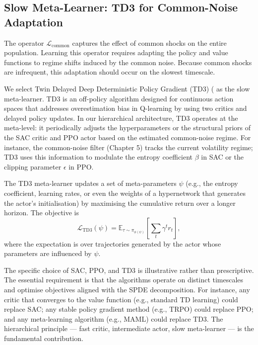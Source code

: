 \subsection{Slow Meta-Learner: TD3 for Common-Noise Adaptation}

The operator $\mathcal{L}_{\mathrm{common}}$ captures the effect of common shocks on
the entire population. Learning this operator requires adapting the policy and value
functions to regime shifts induced by the common noise. Because common shocks are
infrequent, this adaptation should occur on the slowest timescale.

We select Twin Delayed Deep Deterministic Policy Gradient (TD3) (\citep{fujimotoetal2018} as the slow meta-learner. TD3 is an off-policy algorithm designed for
continuous action spaces that addresses overestimation bias in Q-learning by using
two critics and delayed policy updates. In our hierarchical architecture, TD3
operates at the meta-level: it periodically adjusts the hyperparameters or the
structural priors of the SAC critic and PPO actor based on the estimated
common-noise regime. For instance, the common-noise filter (Chapter 5) tracks the
current volatility regime; TD3 uses this information to modulate the entropy
coefficient $\beta$ in SAC or the clipping parameter $\epsilon$ in PPO.

The TD3 meta-learner updates a set of meta-parameters $\psi$ (e.g., the entropy
coefficient, learning rates, or even the weights of a hypernetwork that generates the
actor's initialisation) by maximising the cumulative return over a longer horizon.
The objective is
\begin{equation}
    \mathcal{L}_{\mathrm{TD3}}(\psi) = \mathbb{E}_{\tau \sim \pi_{\phi(\psi)}}\left[
    \sum_t \gamma^t r_t \right],
    \label{eq:td3-loss}
\end{equation}
where the expectation is over trajectories generated by the actor whose parameters
are influenced by $\psi$.

\begin{remark}
The specific choice of SAC, PPO, and TD3 is illustrative rather than prescriptive.
The essential requirement is that the algorithms operate on distinct timescales and
optimise objectives aligned with the SPDE decomposition. For instance, any critic
that converges to the value function (e.g., standard TD learning) could replace SAC;
any stable policy gradient method (e.g., TRPO) could replace PPO; and any
meta-learning algorithm (e.g., MAML) could replace TD3. The hierarchical principle ---
fast critic, intermediate actor, slow meta-learner --- is the fundamental
contribution.
\end{remark}


